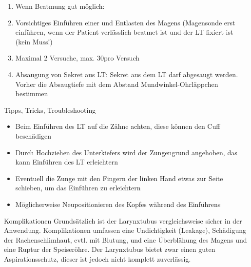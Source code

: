 \documentclass[
ngerman,
paper=a4,
asymmetric,
fontsize=8pt,
draft=false,
numbers=noenddot,
bibtotocnumbered,
footnotes=multiple,
toc=flat,
]{scrbook}
\begin{document}
{\begin{enumerate}
\begin{enumerate}
    Beatmen über den LT bedeutet: Verlegung eines
    Hauptbronchus (Fremdkörper) oder Pneumothorax, es ist
    jedoch  Hinweis für einen zu tief oder falsch
    liegenden Tubus (im Gegensatz zur endotrachealen
    Intubation)!
    \item Messung: sofortige 2-stellige et-Messung,
    Sp steigend oder gleichbleibend, Verfärbung des EasyCap
    II
  \end{enumerate}
  \item Wenn Beatmung gut möglich: 
  \item Vorsichtiges Einführen einer  und Entlasten des
  Magens (Magensonde erst einführen, wenn der Patient
  verlässlich beatmet ist und der LT fixiert ist (kein Muss!)
  \item Maximal 2 Versuche, max. 30\Sec* pro Versuch
  \item Absaugung von Sekret aus LT: Sekret aus dem LT  darf
  abgesaugt werden. Vorher die Absaugtiefe mit dem Abstand
  Mundwinkel-Ohrläppchen bestimmen
\end{enumerate}

}
{}
{}
{}
{}

\Text
{Tipps, Tricks, Troubleshooting}
{
\begin{itemize}
  \item Beim Einführen des LT auf die Zähne achten, diese
  können den Cuff beschädigen
  \item Durch Hochziehen des Unterkiefers wird der
  Zungengrund angehoben, das kann Einführen des LT
  erleichtern
  \item Eventuell die Zunge mit den Fingern der linken Hand
  etwas zur Seite schieben, um das Einführen zu erleichtern
  \item Möglicherweise Neupositionieren des Kopfes während
  des Einführens
\end{itemize}


}
{}
{}
{}
{}

\Text
{Komplikationen}
{Grundsätzlich ist der Larynxtubus vergleichsweise sicher in
der Anwendung. Komplikationen umfassen eine Undichtigkeit
(Leakage), Schädigung der Rachenschlimhaut, evtl. mit
Blutung, und eine Überblähung des Magens und eine Ruptur
der Speiseröhre. Der Larynxtubus bietet zwar einen guten
Aspirationsschutz, dieser ist jedoch nicht komplett
zuverlässig.}
{}
{}
{}
{}
\end{document}
